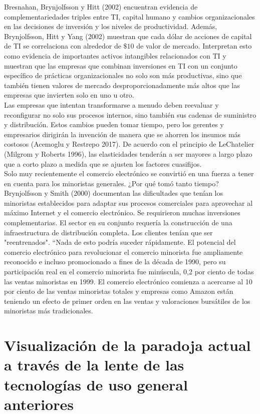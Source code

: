  Bresnahan, Brynjolfsson y Hitt (2002) encuentran evidencia de complementariedades triples entre TI, capital humano y cambios organizacionales en las decisiones de inversión y los niveles de productividad. Además, Brynjolfsson, Hitt y Yang (2002) muestran que cada dólar de acciones de capital de TI se correlaciona con alrededor de $\$10$ de valor de mercado. Interpretan esto como evidencia de importantes activos intangibles relacionados con TI y muestran que las empresas que combinan inversiones en TI con un  conjunto específico de prácticas organizacionales no solo son más productivas, sino que también tienen valores de mercado desproporcionadamente más altos que las empresas que invierten solo en uno u otro.\\
Las empresas que intentan transformarse a menudo deben reevaluar y reconfigurar no solo sus procesos internos, sino también sus cadenas de suministro y distribución. Estos cambios pueden tomar tiempo, pero los gerentes y empresarios dirigirán la invención de manera que se ahorren los insumos más costosos (Acemoglu y Restrepo 2017). De acuerdo con el principio de LeChatelier (Milgrom y Roberts 1996), las elasticidades tenderán a ser mayores a largo plazo que a corto plazo a medida que se ajusten los factores cuasifijos.\\
Solo muy recientemente el comercio electrónico se convirtió en una fuerza a tener en cuenta para los minoristas generales. ¿Por qué tomó tanto tiempo? Brynjolfsson y Smith (2000) documentan las dificultades que tenían los minoristas establecidos para adaptar sus procesos comerciales para aprovechar al máximo Internet y el comercio electrónico. Se requirieron muchas inversiones complementarias. El sector en su conjunto requería la construcción de una infraestructura de distribución completa. Los clientes tenían que ser "reentrenados". “Nada de esto podría suceder rápidamente. El potencial del comercio electrónico para revolucionar el comercio minorista fue ampliamente reconocido e incluso promocionado a fines de la década de 1990, pero su participación real en el comercio minorista fue minúscula, 0,2 por ciento de todas las ventas minoristas en 1999. El comercio electrónico comienza a acercarse al 10 por ciento de las ventas minoristas totales y empresas como Amazon están teniendo un efecto de primer orden en las ventas y valoraciones bursátiles de los minoristas más tradicionales.\\

\section{Visualización de la paradoja actual a través de la lente de las tecnologías de uso general anteriores}



